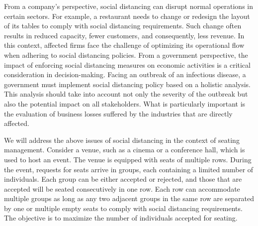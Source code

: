 From a company's perspective, social distancing can disrupt normal operations in certain sectors. For example, a restaurant needs to change or redesign the layout of its tables to comply with social distancing requirements. Such change often results in reduced capacity, fewer customers, and consequently, less revenue. In this context, affected firms face the challenge of optimizing its operational flow when adhering to social distancing policies.
From a government perspective, the impact of enforcing social distancing measures on economic activities is a critical consideration in decision-making. Facing an outbreak of an infectious disease, a government must implement social distancing policy based on a holistic analysis. This analysis should take into account not only the severity of the outbreak but also the potential impact on all stakeholders. What is particularly important is the evaluation of business losses suffered by the industries that are directly affected.  


We will address the above issues of social distancing in the context of seating management. Consider a venue, such as a cinema or a conference hall, which is used to host an event. The venue is equipped with seats of multiple rows. During the event, requests for seats arrive in groups, each containing a limited number of individuals. Each group can be either accepted or rejected, and those that are accepted will be seated consecutively in one row. Each row can accommodate multiple groups as long as any two adjacent groups in the same row are separated by one or multiple empty seats to comply with social distancing requirements. The objective is to maximize the number of individuals accepted for seating. 

